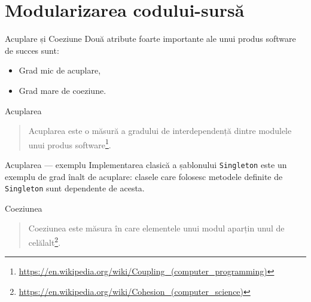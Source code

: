 \documentclass[presentation]{beamer}
\begin{document}
\section{Modularizarea codului-sursă}
\label{sec:org3fab267}
\begin{frame}[label={sec:org57c84b8}]{Acuplare și Coeziune}
Două atribute foarte importante ale unui produs software de succes sunt:
\begin{itemize}
\item Grad mic de acuplare,
\item Grad mare de coeziune.
\end{itemize}
\end{frame}
\begin{frame}[label={sec:orgf9251bb}]{Acuplarea}
\begin{quotation} %
\alert{Acuplarea} este o măsură a gradului de interdependență dintre modulele unui produs software\footnote{\url{https://en.wikipedia.org/wiki/Coupling\_(computer\_programming)}}.
\end{quotation}
\end{frame}
\begin{frame}[label={sec:orgeb20e74},fragile]{Acuplarea --- exemplu}
 Implementarea clasică a șablonului \texttt{Singleton} este un exemplu de grad înalt de acuplare: clasele care folosesc metodele definite de \texttt{Singleton} sunt dependente de acesta.
\end{frame}
\begin{frame}[label={sec:org14dcba2}]{Coeziunea}
\begin{quotation} %
\alert{Coeziunea} este măsura în care elementele unui modul aparțin unul de celălalt\footnote{\url{https://en.wikipedia.org/wiki/Cohesion\_(computer\_science)}}.
\end{quotation}
\end{frame}
\end{document}
